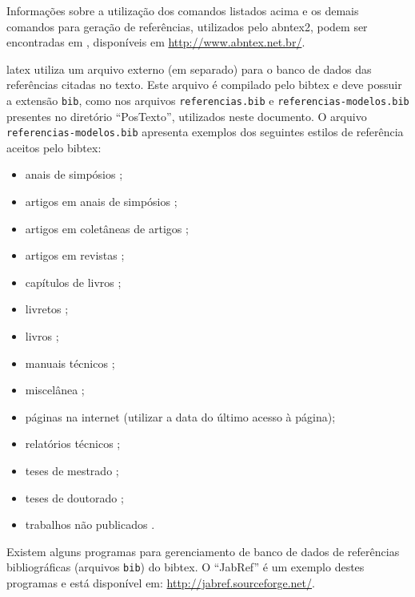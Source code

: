 Informações sobre a utilização dos comandos listados acima e os demais comandos para geração de referências, utilizados pelo \gls{abntex2}, podem ser encontradas em , disponíveis em \url{http://www.abntex.net.br/}.

\gls{latex} utiliza um arquivo externo (em separado) para o banco de dados das referências citadas no texto. Este arquivo é compilado pelo \gls{bibtex} e deve possuir a extensão \texttt{bib}, como nos arquivos \texttt{referencias.bib} e \texttt{referencias-modelos.bib} presentes no diretório ``PosTexto'', utilizados neste documento. O arquivo \texttt{referencias-modelos.bib} apresenta exemplos dos seguintes estilos de referência aceitos pelo \gls{bibtex}:

\begin{itemize}%
\item anais de simpósios \citep{Alt1995,Pirmez2002};
\item artigos em anais de simpósios \citep{Faina2001};
\item artigos em coletâneas de artigos \citep{Pinto2000};
\item artigos em revistas \citep{Guimaraes2003};
\item capítulos de livros \citep{Santos2000};
\item livretos \citep{Thompson2001};
\item livros \citep{Pedrycz1998};
\item manuais técnicos \citep{IONA1999};
\item miscelânea \citep{Cruz2003};
\item páginas na internet \cite[acessado em 1 de janeiro de 2004]{Larsson2003} (utilizar a data do último acesso à página);
\item relatórios técnicos \citep{OMG2000};
\item teses de mestrado \citep{SantosFilho2003};
\item teses de doutorado \citep{Faina2000};
\item trabalhos não publicados \citep{Sichman2002}.
\end{itemize}

Existem alguns programas para gerenciamento de banco de dados de referências bibliográficas (arquivos \texttt{bib}) do \gls{bibtex}. O ``JabRef'' é um exemplo destes programas e está disponível em: \url{http://jabref.sourceforge.net/}.


